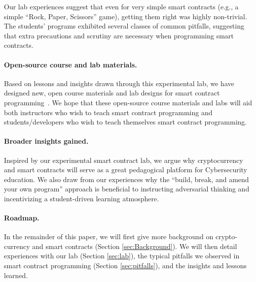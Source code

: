 \documentclass[10pt,twocolumn,letterpaper]{article}
\newcommand{\elaine}[1]{{\color{red}{[elaine: #1]}}}
\begin{document}
Our lab experiences suggest that even for 
very simple smart contracts (e.g., a simple 
``Rock, Paper, Scissors'' game), 
getting them right 
was highly non-trivial.
The students' programs exhibited several classes
of common pitfalls, suggesting that extra precautions 
and scrutiny 
are necessary when programming smart contracts.





\paragraph{Open-source course and lab materials.}
Based on lessons and insights 
drawn through this experimental lab, we have designed
new, open course materials and lab designs 
for smart contract programming~\cite{anonymous}.
We hope that these open-source course materials and labs
will aid both instructors who 
wish to teach smart contract programming and students/developers who 
wish to teach themselves smart contract programming.
\elaine{probably the langugage can be better.}

\paragraph{Broader insights gained.}
Inspired by our experimental 
smart contract lab, 
we argue why cryptocurrency and smart contracts 
will serve as a great pedagogical platform 
for Cybersecurity education.
We also draw from our experiences
why the ``build, break, and amend your own program'' 
approach is beneficial to instructing adversarial thinking
and incentivizing a student-driven learning 
atmosphere.

\paragraph{Roadmap.}
In the remainder of this paper, we will first give more background on 
crypto-currency and smart contracts (Section \ref{sec:Background}). 
We will then detail experiences with our lab (Section \ref{sec:lab}),  
the typical pitfalls we observed in smart  
contract programming (Section \ref{sec:pitfalls}), 
and the insights and lessons learned. 
\end{document}
